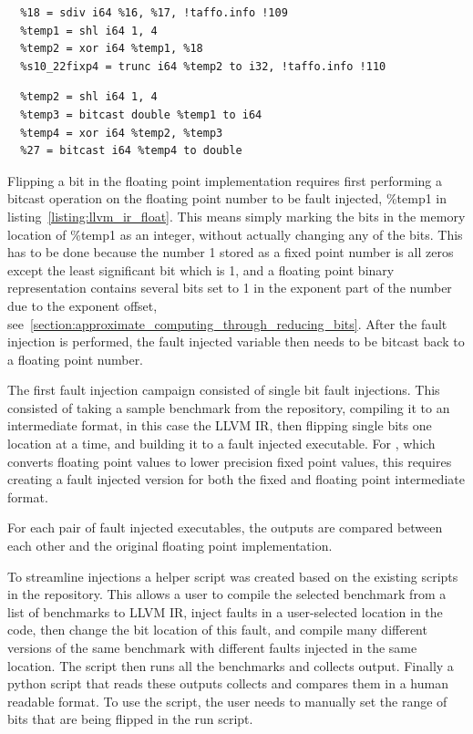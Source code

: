\begin{lstlisting}[caption=fixed point bit flip in LLVM bytecode, label=listing:llvm_ir_fixed]
  %17 = sext i32 %0 to i64, !taffo.info !45
  %18 = sdiv i64 %16, %17, !taffo.info !109
  %temp1 = shl i64 1, 4
  %temp2 = xor i64 %temp1, %18
  %s10_22fixp4 = trunc i64 %temp2 to i32, !taffo.info !110
\end{lstlisting} 

\begin{lstlisting}[caption=floating point bit flip in LLVM bytecode, label=listing:llvm_ir_float]
  %temp1 = fdiv double %24, %26
  %temp2 = shl i64 1, 4
  %temp3 = bitcast double %temp1 to i64
  %temp4 = xor i64 %temp2, %temp3
  %27 = bitcast i64 %temp4 to double
\end{lstlisting}

Flipping a bit in the floating point implementation requires first performing a bitcast operation on the floating point number to be fault injected, \%temp1 in listing~\ref{listing:llvm_ir_float}. This means simply marking the bits in the memory location of \%temp1 as an integer, without actually changing any of the bits. This has to be done because the number 1 stored as a fixed point number is all zeros except the least significant bit which is 1, and a floating point binary representation contains several bits set to 1 in the exponent part of the number due to the exponent offset, see~\ref{section:approximate_computing_through_reducing_bits}. After the fault injection is performed, the fault injected variable then needs to be bitcast back to a floating point number.

The first fault injection campaign consisted of single bit fault injections. This consisted of taking a sample benchmark from the \taffo{} repository, compiling it to an intermediate format, in this case the LLVM IR, then flipping single bits one location at a time, and building it to a fault injected executable. For \taffo{}, which converts floating point values to lower precision fixed point values, this requires creating a fault injected version for both the fixed and floating point intermediate format.

For each pair of fault injected executables, the outputs are compared between each other and the original floating point implementation.

To streamline injections a helper script was created based on the existing scripts in the \taffo{} repository. This allows a user to compile the selected benchmark from a list of benchmarks to LLVM IR, inject faults in a user-selected location in the code, then change the bit location of this fault, and compile many different versions of the same benchmark with different faults injected in the same location. The script then runs all the benchmarks and collects output. Finally a python script that reads these outputs collects and compares them in a human readable format. To use the script, the user needs to manually set the range of bits that are being flipped in the run script. 

